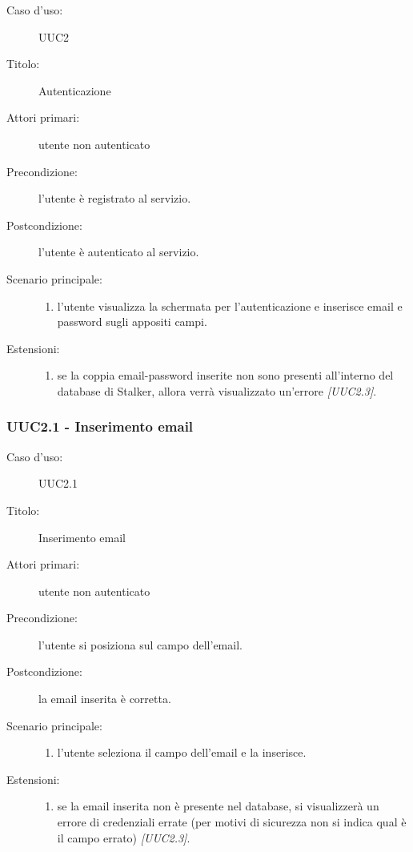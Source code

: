 \documentclass[casi-duso]{subfiles}
\begin{document}
\begin{description}
  \item[Caso d’uso:] UUC2
  \item[Titolo:] Autenticazione
  \item[Attori primari:] utente non autenticato
  \item[Precondizione:] l'utente è registrato al servizio.
  \item[Postcondizione:] l'utente è autenticato al servizio.
  \item[Scenario principale:]
  \begin{enumerate}
    \item l'utente visualizza la schermata per l'autenticazione e inserisce email e password sugli appositi campi.
  \end{enumerate}
  \item[Estensioni:]
  \begin{enumerate}
    \item se la coppia email-password inserite non sono presenti all'interno del database di Stalker, allora verrà visualizzato un'errore \emph{[UUC2.3]}.
  \end{enumerate}
\end{description}

\subsubsection{UUC2.1 - Inserimento email}%
\label{subsub:UUC2.1utente}
\begin{description}
  \item[Caso d’uso:] UUC2.1
  \item[Titolo:] Inserimento email
  \item[Attori primari:] utente non autenticato
  \item[Precondizione:] l'utente si posiziona sul campo dell'email.
  \item[Postcondizione:] la email inserita è corretta.
  \item[Scenario principale:]
  \begin{enumerate}
    \item l'utente seleziona il campo dell'email e la inserisce.
  \end{enumerate}
  \item[Estensioni:]
  \begin{enumerate}
    \item se la email inserita non è presente nel database, si visualizzerà un errore di credenziali errate (per motivi di sicurezza non si indica qual è il campo errato) \emph{[UUC2.3]}.
  \end{enumerate}
\end{description}
\end{document}
